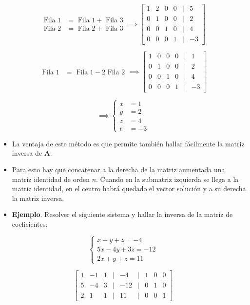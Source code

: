 \documentclass[openany]{book}
\providecommand{\tightlist}{%
  \setlength{\itemsep}{0pt}\setlength{\parskip}{0pt}}
\begin{document}
\[
\begin{array}{cl}
\text{Fila 1} &= \text{ Fila 1} + \text{ Fila 3} \\ 
\text{Fila 2} &= \text{ Fila 2} + \text{ Fila 3}
\end{array}
\implies
\begin{bmatrix}
1 & 2 & 0 & 0 &|& 5\\
0 & 1 & 0 & 0 &|& 2\\
0 & 0 & 1 & 0 &|& 4\\
0 & 0 & 0 & 1 &|& -3  
\end{bmatrix}
\]

\[
\begin{array}{cl}
\text{Fila 1} &= \text{ Fila 1} -2 \text{ Fila 2} 
\end{array}
\implies
\begin{bmatrix}
1 & 0 & 0 & 0 &|& 1\\
0 & 1 & 0 & 0 &|& 2\\
0 & 0 & 1 & 0 &|& 4\\
0 & 0 & 0 & 1 &|& -3  
\end{bmatrix}
\]

\[
\implies
\left\{
\begin{aligned}
x &= 1\\ y &= 2\\ z &= 4\\ t &= -3
\end{aligned}
\right.
\]

\begin{itemize}
\tightlist
\item
  La ventaja de este método es que permite también hallar fácilmente la matriz inversa de \(\mathbf{A}\).
\item
  Para esto hay que concatenar a la derecha de la matriz aumentada una matriz identidad de orden \(n\). Cuando en la submatriz izquierda se llega a la matriz identidad, en el centro habrá quedado el vector solución y a su derecha la matriz inversa.
\item
  \textbf{Ejemplo}. Resolver el siguiente sistema y hallar la inversa de la matriz de coeficientes:
\end{itemize}

\[
\begin{cases} 
x-y+z=-4 \\
5x-4y+3z=-12 \\
2x+y+z=11
\end{cases}
\]

\[
\begin{bmatrix}
    1 & -1 & 1 &|& -4 &|& 1 & 0 & 0\\
    5 & -4 & 3 &|& -12 &|& 0 & 1 & 0\\
    2 & 1 & 1 &|& 11 &|& 0 & 0 & 1
\end{bmatrix}
\]
\end{document}
